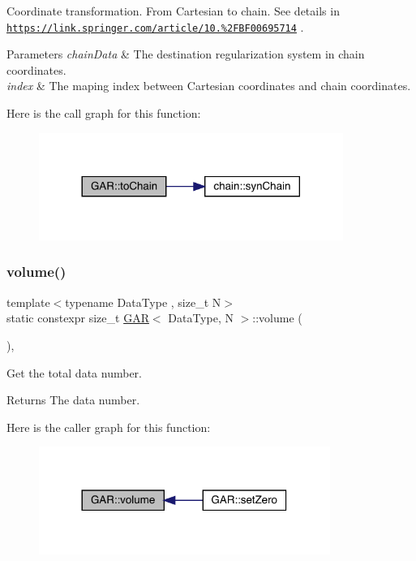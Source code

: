 Coordinate transformation. From Cartesian to chain. See details in \href{https://link.springer.com/article/10.1007%2FBF00695714}{\tt https\+://link.\+springer.\+com/article/10.\%2\+F\+B\+F00695714} . 
\begin{DoxyParams}{Parameters}
{\em chain\+Data} & The destination regularization system in chain coordinates. \\
\hline
{\em index} & The maping index between Cartesian coordinates and chain coordinates. \\
\hline
\end{DoxyParams}
Here is the call graph for this function\+:\nopagebreak
\begin{figure}[H]
\begin{center}
\leavevmode
\includegraphics[width=281pt]{class_g_a_r_a18041ac48dc47e6ada3e8a33893b1200_cgraph}
\end{center}
\end{figure}
\mbox{\label{class_g_a_r_abdbcc31db058125bd2ee207e7648b20b}} 
\subsubsection{\texorpdfstring{volume()}{volume()}}
{\footnotesize\ttfamily template$<$typename Data\+Type , size\+\_\+t N$>$ \\
static constexpr size\+\_\+t \mbox{\hyperlink{class_g_a_r}{G\+AR}}$<$ Data\+Type, N $>$\+::volume (\begin{DoxyParamCaption}{ }\end{DoxyParamCaption})\hspace{0.3cm}{\ttfamily [inline]}, {\ttfamily [static]}}



Get the total data number. 

\begin{DoxyReturn}{Returns}
The data number. 
\end{DoxyReturn}
Here is the caller graph for this function\+:\nopagebreak
\begin{figure}[H]
\begin{center}
\leavevmode
\includegraphics[width=269pt]{class_g_a_r_abdbcc31db058125bd2ee207e7648b20b_icgraph}
\end{center}
\end{figure}


